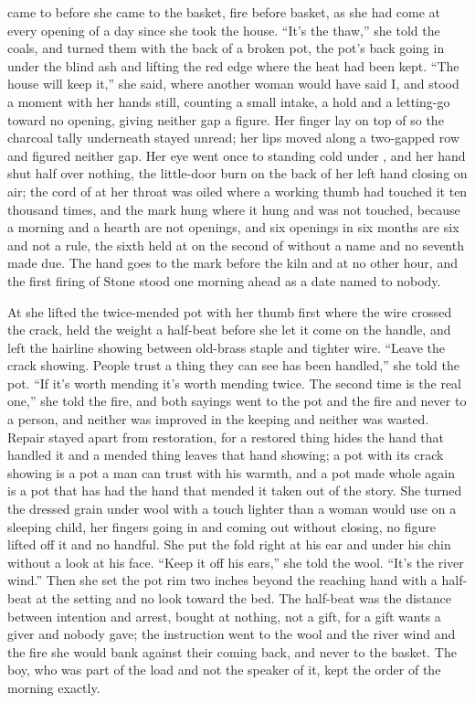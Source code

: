  came to  before she came to the basket, fire before basket, as she had come at every opening of a day since she took the house. “It's the thaw,” she told the coals, and turned them with the back of a broken pot, the pot's back going in under the blind ash and lifting the red edge where the heat had been kept. “The house will keep it,” she said, where another woman would have said I, and stood a moment with her hands still, counting a small intake, a hold and a letting-go toward no opening, giving neither gap a figure. Her finger lay on top of  so the charcoal tally underneath stayed unread; her lips moved along a two-gapped row and figured neither gap. Her eye went once to  standing cold under , and her hand shut half over nothing, the little-door burn on the back of her left hand closing on air; the cord of  at her throat was oiled where a working thumb had touched it ten thousand times, and the mark hung where it hung and was not touched, because a morning and a hearth are not openings, and six openings in six months are six and not a rule, the sixth held at  on the second of  without a name and no seventh made due. The hand goes to the mark before the kiln and at no other hour, and the first firing of Stone stood one morning ahead as a date named to nobody.

At  she lifted the twice-mended pot with her thumb first where the wire crossed the crack, held the weight a half-beat before she let it come on the handle, and left the hairline showing between old-brass staple and tighter wire. “Leave the crack showing. People trust a thing they can see has been handled,” she told the pot. “If it's worth mending it's worth mending twice. The second time is the real one,” she told the fire, and both sayings went to the pot and the fire and never to a person, and neither was improved in the keeping and neither was wasted. Repair stayed apart from restoration, for a restored thing hides the hand that handled it and a mended thing leaves that hand showing; a pot with its crack showing is a pot a man can trust with his warmth, and a pot made whole again is a pot that has had the hand that mended it taken out of the story. She turned the dressed grain under wool with a touch lighter than a woman would use on a sleeping child, her fingers going in and coming out without closing, no figure lifted off it and no handful. She put the fold right at his ear and under his chin without a look at his face. “Keep it off his ears,” she told the wool. “It's the river wind.” Then she set the pot rim two inches beyond the reaching hand with a half-beat at the setting and no look toward the bed. The half-beat was the distance between intention and arrest, bought at nothing, not a gift, for a gift wants a giver and nobody gave; the instruction went to the wool and the river wind and the fire she would bank against their coming back, and never to the basket. The boy, who was part of the load and not the speaker of it, kept the order of the morning exactly.

